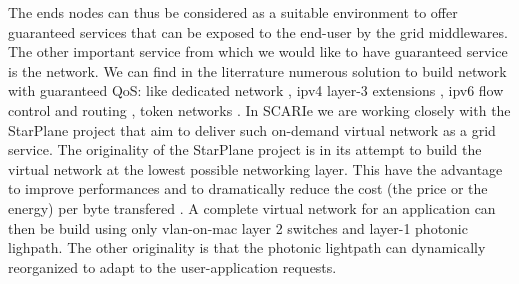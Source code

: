 The ends nodes can thus be considered as a suitable environment to offer
guaranteed services that can be exposed to the end-user by the grid 
middlewares. The other important service from which we would like to have 
guaranteed service is the network. We can find in the literrature numerous 
solution to build network with guaranteed QoS: like 
dedicated network \cite{blahblah}, ipv4 layer-3 extensions \cite{}, ipv6 flow
control and routing \cite{}, token networks \cite{}. In SCARIe we are working 
closely with the StarPlane project that aim to deliver such on-demand 
virtual network as a grid service. The originality of the StarPlane project 
is in its attempt to build the virtual network at the lowest possible networking 
layer. This have the advantage to improve performances and to dramatically 
reduce the cost (the price or the energy) per byte transfered \cite{}. 
A complete virtual network for an application can then be build using only
vlan-on-mac layer 2 switches and layer-1 photonic lighpath. The other originality 
is that the photonic lightpath can dynamically reorganized to adapt to the
user-application requests. 


